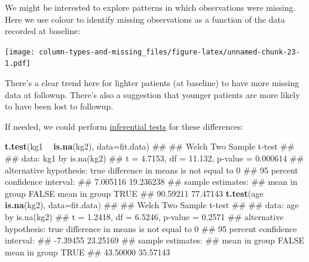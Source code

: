 \documentclass[]{article}
\newenvironment{Shaded}{\begin{snugshade}}{\end{snugshade}}
\newcommand{\KeywordTok}[1]{\textcolor[rgb]{0.13,0.29,0.53}{\textbf{#1}}}
\newcommand{\DataTypeTok}[1]{\textcolor[rgb]{0.13,0.29,0.53}{#1}}
\newcommand{\StringTok}[1]{\textcolor[rgb]{0.31,0.60,0.02}{#1}}
\newcommand{\OperatorTok}[1]{\textcolor[rgb]{0.81,0.36,0.00}{\textbf{#1}}}
\newcommand{\NormalTok}[1]{#1}
\theoremstyle{definition}
\theoremstyle{definition}
\theoremstyle{definition}
\theoremstyle{remark}
\begin{document}
We might be interested to explore patterns in which observations were
missing. Here we use colour to identify missing observations as a
function of the data recorded at baseline:

\begin{Shaded}
\end{Shaded}

\texttt{[image: column-types-and-missing\_files/figure-latex/unnamed-chunk-23-1.pdf]}

There's a clear trend here for lighter patients (at baseline) to have
more missing data at followup. There's also a suggestion that younger
patients are more likely to have been lost to followup.

If needed, we could perform
\protect\hyperlink{common-inferential-stats}{inferential tests} for
these differences:

\begin{Shaded}
\begin{Highlighting}[]
\KeywordTok{t.test}\NormalTok{(kg1 }\OperatorTok{~}\StringTok{ }\KeywordTok{is.na}\NormalTok{(kg2), }\DataTypeTok{data=}\NormalTok{fit.data)}
\NormalTok{## }
\NormalTok{##  Welch Two Sample t-test}
\NormalTok{## }
\NormalTok{## data:  kg1 by is.na(kg2)}
\NormalTok{## t = 4.7153, df = 11.132, p-value = 0.000614}
\NormalTok{## alternative hypothesis: true difference in means is not equal to 0}
\NormalTok{## 95 percent confidence interval:}
\NormalTok{##   7.005116 19.236238}
\NormalTok{## sample estimates:}
\NormalTok{## mean in group FALSE  mean in group TRUE }
\NormalTok{##            90.59211            77.47143}
\KeywordTok{t.test}\NormalTok{(age }\OperatorTok{~}\StringTok{ }\KeywordTok{is.na}\NormalTok{(kg2), }\DataTypeTok{data=}\NormalTok{fit.data)}
\NormalTok{## }
\NormalTok{##  Welch Two Sample t-test}
\NormalTok{## }
\NormalTok{## data:  age by is.na(kg2)}
\NormalTok{## t = 1.2418, df = 6.5246, p-value = 0.2571}
\NormalTok{## alternative hypothesis: true difference in means is not equal to 0}
\NormalTok{## 95 percent confidence interval:}
\NormalTok{##  -7.39455 23.25169}
\NormalTok{## sample estimates:}
\NormalTok{## mean in group FALSE  mean in group TRUE }
\NormalTok{##            43.50000            35.57143}
\end{Highlighting}
\end{Shaded}
\end{document}
